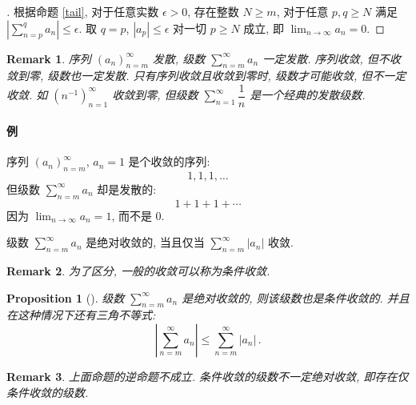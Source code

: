 \documentclass[UTF8]{ctexart}
\theoremstyle{mystyle}
\newtheorem{proposition}{Proposition}[section]
\theoremstyle{myremark}
\newtheorem*{remark}{Remark}
\theoremstyle{plain}
\begin{document}
\begin{proof}[]
    根据命题 \ref{tail}, 对于任意实数 $ \epsilon > 0 $, 存在整数 $ N \geqslant m $, 对于任意 $ p, q \geqslant N $ 满足 $ \displaystyle \left| \sum_{n = p}^q a_n \right| \leqslant \epsilon $. 取 $ q = p $, $ |a_p| \leqslant \epsilon $ 对一切 $ p \geqslant N $ 成立, 即 $ \displaystyle \lim_{n \to \infty} a_n = 0 $.
\end{proof}

\begin{remark}
    序列 $ (a_n)_{n = m}^\infty $ 发散, 级数 $ \displaystyle \sum_{n = m}^\infty a_n $ 一定发散. 序列收敛, 但不收敛到零, 级数也一定发散. 只有序列收敛且收敛到零时, 级数才可能收敛, 但不一定收敛. 如 $ (n^{-1})_{n = 1}^\infty $ 收敛到零, 但级数 $ \displaystyle \sum_{n = 1}^\infty \dfrac{1}{n} $ 是一个经典的发散级数.
\end{remark}

\paragraph{例}
序列 $ (a_n)_{n = m}^\infty $, $ a_n = 1 $ 是个收敛的序列: \[ 1, 1, 1, \dots \] 但级数 $ \displaystyle \sum_{n = m}^\infty a_n $ 却是发散的: \[ 1 + 1 + 1 + \cdots \] 因为 $ \displaystyle \lim_{n \to \infty} a_n = 1 $, 而不是 $ 0 $.


\begin{definition}
    级数 $ \displaystyle \sum_{n = m}^\infty a_n $ 是绝对收敛的, 当且仅当 $ \displaystyle \sum_{n = m}^\infty |a_n| $ 收敛.
\end{definition}

\begin{remark}
    为了区分, 一般的收敛可以称为条件收敛.
\end{remark}


\begin{proposition}[]
    级数 $ \displaystyle \sum_{n = m}^\infty a_n $ 是绝对收敛的, 则该级数也是条件收敛的. 并且在这种情况下还有三角不等式: \[ \left| \sum_{n = m}^{\infty} a_n \right| \leqslant \sum_{n = m}^{\infty} |a_n|  \,.\]
\end{proposition}

\begin{remark}
    上面命题的逆命题不成立. 条件收敛的级数不一定绝对收敛, 即存在仅条件收敛的级数.
\end{remark}
\end{document}
